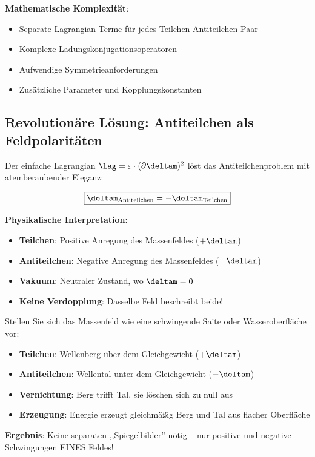 	\textbf{Mathematische Komplexität}:
	\begin{itemize}
		\item Separate Lagrangian-Terme für jedes Teilchen-Antiteilchen-Paar
		\item Komplexe Ladungskonjugationsoperatoren
		\item Aufwendige Symmetrieanforderungen
		\item Zusätzliche Parameter und Kopplungskonstanten
	\end{itemize}
	
	\subsection{Revolutionäre Lösung: Antiteilchen als Feldpolaritäten}
	
	Der einfache Lagrangian $\Lag = \varepsilon \cdot (\partial \deltam)^2$ löst das Antiteilchenproblem mit atemberaubender Eleganz:
	
	\begin{equation}
		\boxed{\deltam_{\text{Antiteilchen}} = -\deltam_{\text{Teilchen}}}
		\label{eq:antiparticle_solution}
	\end{equation}
	
	\textbf{Physikalische Interpretation}:
	\begin{itemize}
		\item \textbf{Teilchen}: Positive Anregung des Massenfeldes ($+\deltam$)
		\item \textbf{Antiteilchen}: Negative Anregung des Massenfeldes ($-\deltam$)  
		\item \textbf{Vakuum}: Neutraler Zustand, wo $\deltam = 0$
		\item \textbf{Keine Verdopplung}: Dasselbe Feld beschreibt beide!
	\end{itemize}
	
	\begin{tcolorbox}[colback=green!5!white,colframe=green!75!black,title=Elegantes Antiteilchen-Bild]
		Stellen Sie sich das Massenfeld wie eine schwingende Saite oder Wasseroberfläche vor:
		\begin{itemize}
			\item \textbf{Teilchen}: Wellenberg über dem Gleichgewicht ($+\deltam$)
			\item \textbf{Antiteilchen}: Wellental unter dem Gleichgewicht ($-\deltam$)
			\item \textbf{Vernichtung}: Berg trifft Tal, sie löschen sich zu null aus
			\item \textbf{Erzeugung}: Energie erzeugt gleichmäßig Berg und Tal aus flacher Oberfläche
		\end{itemize}
		
		\textbf{Ergebnis}: Keine separaten ,,Spiegelbilder'' nötig -- nur positive und negative Schwingungen EINES Feldes!
	\end{tcolorbox}
	
